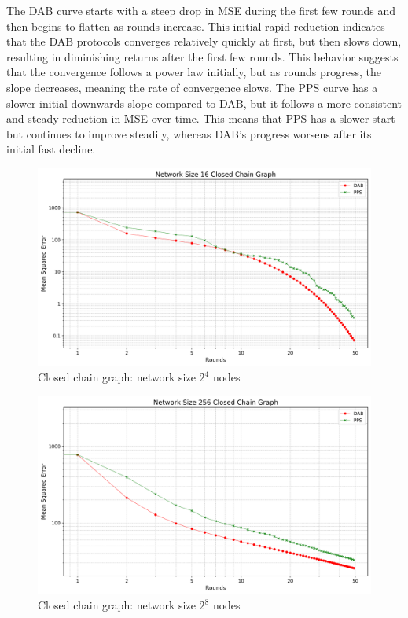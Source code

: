 The DAB curve starts with a steep drop in MSE during the first few rounds and then begins to flatten as rounds increase.
This initial rapid reduction indicates that the DAB protocols converges relatively quickly at first, but then slows down, resulting in diminishing returns after the first few rounds.
This behavior suggests that the convergence follows a power law initially, but as rounds progress, the slope decreases, meaning the rate of convergence slows. The PPS curve has a slower initial downwards slope compared to DAB, but it follows a more consistent and steady reduction in MSE over time.
This means that PPS has a slower start but continues to improve steadily, whereas DAB's progress worsens after its initial fast decline.
\begin{figure}[H]
    \centering
    \includegraphics[scale=0.5]{figures/closedChainSimulations/DAB_vs_PPS_CCG_r50_n16.png}
    \caption{Closed chain graph: network size $2^{4}$ nodes}
    \label{fig:16ChainGraph}
\end{figure}

\begin{figure}[H]
    \centering
    \includegraphics[scale=0.5]{figures/closedChainSimulations/DAB_vs_PPS_CCG_r50_n256.png}
    \caption{Closed chain graph: network size $2^{8}$ nodes}
    \label{fig:256ChainGraph}
\end{figure}

